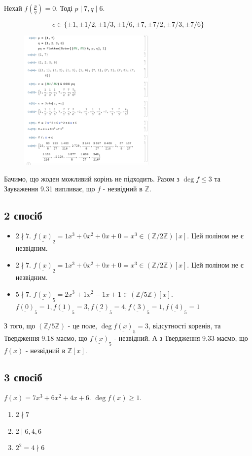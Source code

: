 \documentclass[11pt, a4paper]{article} %
\newcommand{\Z}{\mathbb{Z}}
\begin{document}
Нехай $f(\frac{p}{q}) = 0$.
Тоді $p\mid 7, q \mid 6$.

\[c \in \{ \pm 1, \pm 1/2, \pm 1/3, \pm 1/6, \pm 7, \pm 7/2, \pm 7/3, \pm 7/6\}\]
\begin{figure}[h]
    \includegraphics[width=0.6\textwidth]{6.1.png}
    \centering
\end{figure}

Бачимо, що жоден можливий корінь не підходить. 
Разом з $\deg f \le 3$ та Зауваження 9.31 випливає, що $f$ - незвідний в $\Z$.

\newpage
\subsection*{2 спосіб}
\begin{itemize}
    \item $2\nmid 7$. $\underline{f(x)}_2 = 1x^3+0x^2+0x+0 = x^3 \in (\Z/2\Z)[x]$. Цей поліном не є незвідним.
    \item $2\nmid 7$. $\underline{f(x)}_2 = 1x^3+0x^2+0x+0 = x^3 \in (\Z/2\Z)[x]$. Цей поліном не є незвідним.
    \item $5\nmid 7$. $\underline{f(x)}_5 = 2x^3+1x^2-1x+1 \in (\Z/5\Z)[x]$.\\
    $\underline{f(0)}_5 = 1, \underline{f(1)}_5 = 3, \underline{f(2)}_5 = 4, \underline{f(3)}_5 = 1, \underline{f(4)}_5 = 1$\\
\end{itemize}
З того, що $(\Z/5\Z)$ - це поле, $\deg \underline{f(x)}_5=3$, відсутності коренів, та Твердження 9.18 маємо, 
що $\underline{f(x)}_5$ - незвідний.
А з Твердження 9.33 маємо, що $f(x)$ - незвідний в $\Z[x]$.

\subsection*{3 спосіб}
$f(x) = 7x^3 + 6x^2 + 4x + 6$. $\deg f(x) \ge 1$.
\begin{enumerate}
    \item $2 \nmid 7$
    \item $2 \mid 6,4,6$
    \item $2^2=4 \nmid 6$
\end{enumerate}
\end{document}
